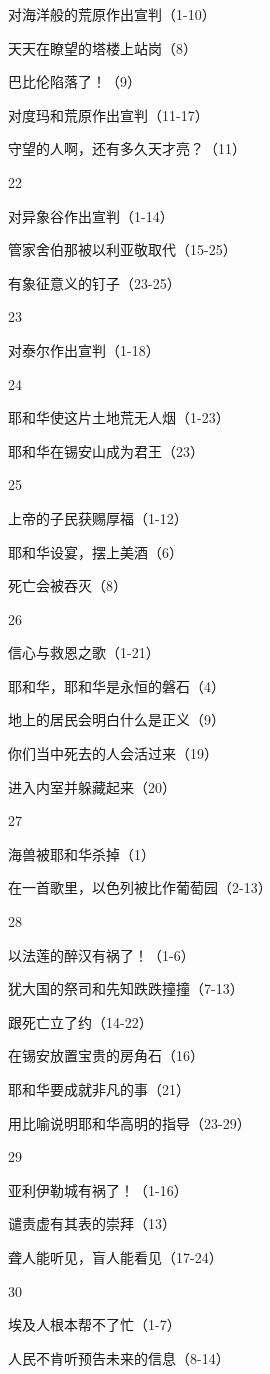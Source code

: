 对海洋般的荒原作出宣判（1-10）

天天在瞭望的塔楼上站岗（8）

巴比伦陷落了！（9）

对度玛和荒原作出宣判（11-17）

守望的人啊，还有多久天才亮？（11）

22

对异象谷作出宣判（1-14）

管家舍伯那被以利亚敬取代（15-25）

有象征意义的钉子（23-25）

23

对泰尔作出宣判（1-18）

24

耶和华使这片土地荒无人烟（1-23）

耶和华在锡安山成为君王（23）

25

上帝的子民获赐厚福（1-12）

耶和华设宴，摆上美酒（6）

死亡会被吞灭（8）

26

信心与救恩之歌（1-21）

耶和华，耶和华是永恒的磐石（4）

地上的居民会明白什么是正义（9）

你们当中死去的人会活过来（19）

进入内室并躲藏起来（20）

27

海兽被耶和华杀掉（1）

在一首歌里，以色列被比作葡萄园（2-13）

28

以法莲的醉汉有祸了！（1-6）

犹大国的祭司和先知跌跌撞撞（7-13）

跟死亡立了约（14-22）

在锡安放置宝贵的房角石（16）

耶和华要成就非凡的事（21）

用比喻说明耶和华高明的指导（23-29）

29

亚利伊勒城有祸了！（1-16）

谴责虚有其表的崇拜（13）

聋人能听见，盲人能看见（17-24）

30

埃及人根本帮不了忙（1-7）

人民不肯听预告未来的信息（8-14）

